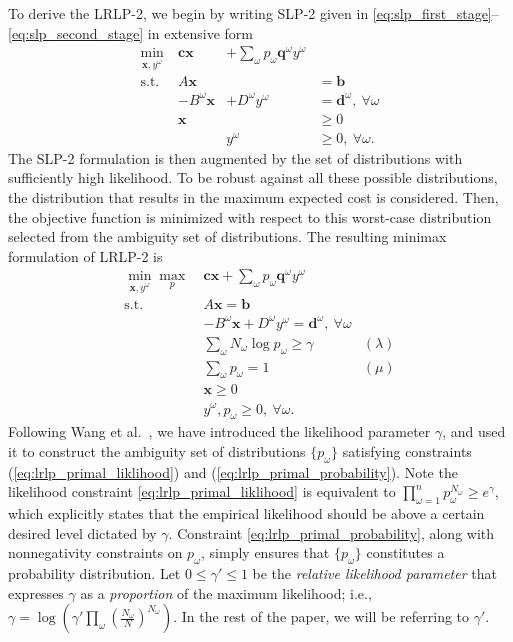 \documentclass[12pt]{amsart}
\newcommand{\x}{\mathbf{x}}
\renewcommand{\c}{\mathbf{c}}
\newcommand{\q}{\mathbf{q}}
\renewcommand{\b}{\mathbf{b}}
\renewcommand{\d}{\mathbf{d}}
\newcommand{\st}{\mbox{s.t.}}
\begin{document}
To derive the LRLP-2, we begin by writing SLP-2 given in \eqref{eq:slp_first_stage}--\eqref{eq:slp_second_stage} in extensive form
\[
	\begin{array}{rrrl}
		\min_{\x,y^\omega} \ & \c\x & + \sum_\omega p_\omega \q^\omega y^\omega \label{eq:slp2cost} \\
		\st \ & A\x & & = \b \nonumber \\
		& -B^\omega \x & + D^\omega y^\omega & = \d^\omega,\ \forall \omega \nonumber \\
		& \x & & \geq 0 \nonumber \\
		& & y^\omega & \geq 0,\ \forall \omega. \nonumber
	\end{array}
\]
The SLP-2 formulation is then augmented by the set of distributions with sufficiently high likelihood. 
To be robust against all these possible distributions, the distribution that results in the maximum expected cost is considered. 
Then, the objective function is minimized with respect to this worst-case distribution selected from the ambiguity set of distributions.
The resulting minimax formulation of LRLP-2 is
\begin{align}
	\min_{\x,y^\omega} \max_p \ & \c\x + \sum_\omega p_\omega \q^\omega y^\omega \label{eq:lrlp_primal}\\
	\st \ & A\x = \b \nonumber \\
	& -B^\omega \x + D^\omega y^\omega = \d^\omega,\ \forall \omega \nonumber \\
	& \sum_\omega N_\omega \log p_\omega \geq \gamma & (\lambda) \label{eq:lrlp_primal_liklihood} \\
	& \sum_\omega p_\omega = 1 & (\mu) \label{eq:lrlp_primal_probability} \\
	& \x \geq 0 \nonumber \\
	& y^\omega, p_\omega \geq 0,\ \forall \omega. \nonumber
\end{align}
Following Wang et al.\ \cite{wang2010likelihood}, we have introduced the likelihood parameter $\gamma$, and used it to construct the ambiguity set of distributions $\{p_\omega\}$ satisfying constraints (\ref{eq:lrlp_primal_liklihood}) and (\ref{eq:lrlp_primal_probability}).
Note the likelihood constraint \eqref{eq:lrlp_primal_liklihood} is equivalent to $\prod_{\omega=1}^n p_\omega^{N_\omega} \geq e^\gamma$, which explicitly states that the empirical likelihood should be above a certain desired level dictated by $\gamma$. 
Constraint \eqref{eq:lrlp_primal_probability}, along with nonnegativity constraints on $p_\omega$, simply ensures that $\{p_\omega\}$ constitutes a probability distribution. 
Let $0 \leq \gamma' \leq 1$ be the \emph{relative likelihood parameter} that expresses $\gamma$ as a {\it proportion} of the maximum likelihood; i.e., $\gamma = \log( \gamma' \prod_\omega (\tfrac{N_\omega}{N})^{N_\omega})$.
In the rest of the paper, we will be referring to $\gamma'$. 
\end{document}
